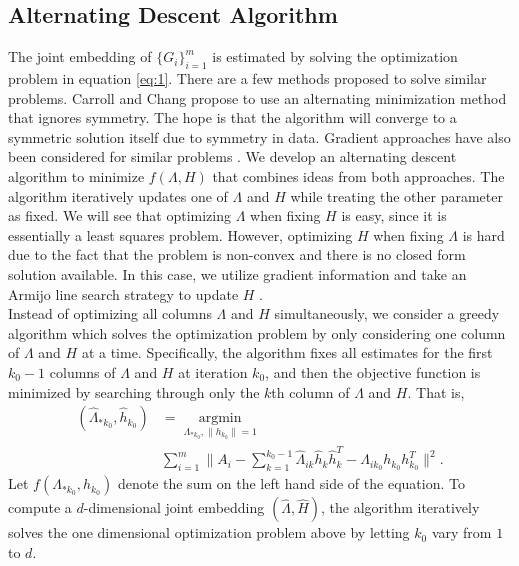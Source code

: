 \documentclass[10pt,journal,compsoc]{IEEEtran}
\begin{document}
\subsection{Alternating Descent Algorithm}
\noindent The joint embedding of $\{G_i \} _{i=1}^{m}$ is estimated by solving the optimization problem in equation \eqref{eq:1}. There are a few methods proposed to solve similar problems. Carroll and Chang \cite{carroll1970analysis} propose to use an alternating minimization method that ignores symmetry. The hope is that the algorithm will converge to a symmetric solution itself due to symmetry in data. Gradient approaches have also been considered for similar problems \cite{tang2009clustering} \cite{kolda2015numerical}. We develop an alternating descent algorithm to minimize $f(\Lambda,H)$ that combines ideas from both approaches. The algorithm iteratively updates one of $\Lambda$ and $H$ while treating the other parameter as fixed. We will see that optimizing $\Lambda$ when fixing $H$ is easy, since it is essentially a least squares problem. However, optimizing $H$ when fixing $\Lambda$ is hard due to the fact that the problem is non-convex and there is no closed form solution available. In this case, we utilize gradient information and take an Armijo line search strategy to update $H$ \cite{nocedal2006numerical}. \\

\noindent Instead of optimizing all columns $\Lambda$ and $H$ simultaneously, we consider a greedy algorithm which solves the optimization problem by only considering one column of  $\Lambda$ and $H$ at a time. Specifically, the algorithm fixes all estimates for the first $k_0-1$ columns of $\Lambda$ and $H$ at iteration $k_0$, and then the objective function is minimized by searching through only the $k$th column of $\Lambda$ and $H$. That is,
\begin{align}(\hat{\Lambda}_{*k_0},\hat{h}_{k_0}) &= \underset{\Lambda_{*k_0},\|h_{k_0}\|=1}{\operatorname{argmin}} \nonumber\\ &\sum\limits_{i=1}^{m} \| A_i- \sum\limits_{k=1}^{k_0-1} \hat{\Lambda}_{ik} \hat{h}_{k} \hat{h}_{k}^T -\Lambda_{ik_0} h_{k_0} h_{k_0}^T\|  ^2.
\label{eq:2}
\end{align} 
Let $f(\Lambda_{*k_0},h_{k_0})$ denote the sum on the left hand side of the equation. To compute a $d$-dimensional joint embedding $(\hat{\Lambda},\hat{H})$, the algorithm iteratively solves the one dimensional optimization problem above by letting $k_0$ vary from $1$ to $d$. \\
\end{document}
